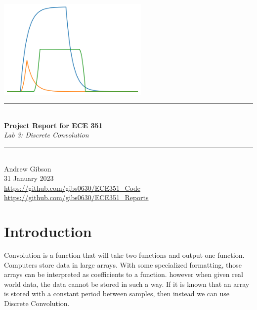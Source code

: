 \documentclass[12pt,a4paper]{article}
\newcommand{\HRule}{\rule{\linewidth}{0.5mm}}
\begin{document}
\begin{titlepage}
\begin{center}
\includegraphics[width=0.55\textwidth]{titlepage_image.png}~\\[2cm]
\HRule \\[0.4cm]
{ \LARGE 
  \textbf{Project Report for ECE 351}\\[0.4cm]
  \emph{Lab 3: Discrete Convolution}\\[0.4cm]
}
\HRule \\[1.5cm]
{ \large
  Andrew Gibson \\[0.1cm]
  31 January 2023\\[0.1cm]
  \url{https://github.com/gibs0630/ECE351\_Code}\\[0.1cm]
  \url{https://github.com/gibs0630/ECE351\_Reports}\\[0.1cm]
}
\vfill
{\large }
 
\end{center}
\end{titlepage}
\newpage
\tableofcontents
{}
\newpage
\setcounter{page}{1}
\section{Introduction}\label{sec:intro}
Convolution is a function that will take two functions and output one function.
Computers store data in large arrays. With some specialized formatting, those arrays can be interpreted as coefficients to a function. however when given real world data, the data cannot be stored in such a way.  If it is known that an array is stored with a constant period between samples, then instead we can use Discrete Convolution. 
\end{document}
